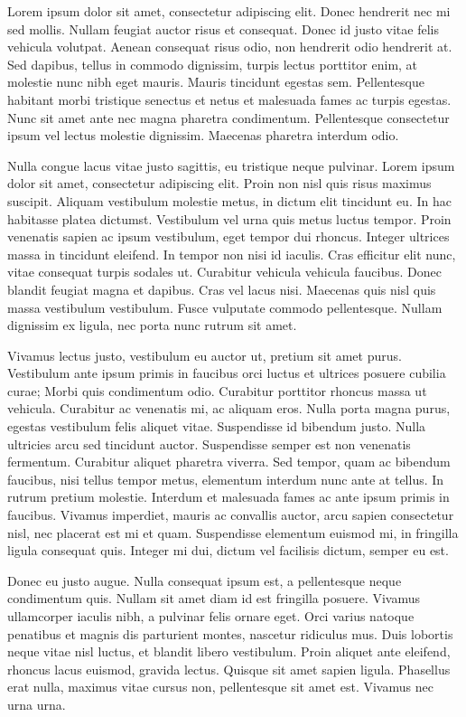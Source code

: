 \documentclass{memoir}
\begin{document}
Lorem ipsum dolor sit amet, consectetur adipiscing elit. Donec hendrerit nec mi sed mollis. Nullam feugiat auctor risus et consequat. Donec id justo vitae felis vehicula volutpat. Aenean consequat risus odio, non hendrerit odio hendrerit at. Sed dapibus, tellus in commodo dignissim, turpis lectus porttitor enim, at molestie nunc nibh eget mauris. Mauris tincidunt egestas sem. Pellentesque habitant morbi tristique senectus et netus et malesuada fames ac turpis egestas. Nunc sit amet ante nec magna pharetra condimentum. Pellentesque consectetur ipsum vel lectus molestie dignissim. Maecenas pharetra interdum odio.

Nulla congue lacus vitae justo sagittis, eu tristique neque pulvinar. Lorem ipsum dolor sit amet, consectetur adipiscing elit. Proin non nisl quis risus maximus suscipit. Aliquam vestibulum molestie metus, in dictum elit tincidunt eu. In hac habitasse platea dictumst. Vestibulum vel urna quis metus luctus tempor. Proin venenatis sapien ac ipsum vestibulum, eget tempor dui rhoncus. Integer ultrices massa in tincidunt eleifend. In tempor non nisi id iaculis. Cras efficitur elit nunc, vitae consequat turpis sodales ut. Curabitur vehicula vehicula faucibus. Donec blandit feugiat magna et dapibus. Cras vel lacus nisi. Maecenas quis nisl quis massa vestibulum vestibulum. Fusce vulputate commodo pellentesque. Nullam dignissim ex ligula, nec porta nunc rutrum sit amet.

Vivamus lectus justo, vestibulum eu auctor ut, pretium sit amet purus. Vestibulum ante ipsum primis in faucibus orci luctus et ultrices posuere cubilia curae; Morbi quis condimentum odio. Curabitur porttitor rhoncus massa ut vehicula. Curabitur ac venenatis mi, ac aliquam eros. Nulla porta magna purus, egestas vestibulum felis aliquet vitae. Suspendisse id bibendum justo. Nulla ultricies arcu sed tincidunt auctor. Suspendisse semper est non venenatis fermentum. Curabitur aliquet pharetra viverra. Sed tempor, quam ac bibendum faucibus, nisi tellus tempor metus, elementum interdum nunc ante at tellus. In rutrum pretium molestie. Interdum et malesuada fames ac ante ipsum primis in faucibus. Vivamus imperdiet, mauris ac convallis auctor, arcu sapien consectetur nisl, nec placerat est mi et quam. Suspendisse elementum euismod mi, in fringilla ligula consequat quis. Integer mi dui, dictum vel facilisis dictum, semper eu est.

Donec eu justo augue. Nulla consequat ipsum est, a pellentesque neque condimentum quis. Nullam sit amet diam id est fringilla posuere. Vivamus ullamcorper iaculis nibh, a pulvinar felis ornare eget. Orci varius natoque penatibus et magnis dis parturient montes, nascetur ridiculus mus. Duis lobortis neque vitae nisl luctus, et blandit libero vestibulum. Proin aliquet ante eleifend, rhoncus lacus euismod, gravida lectus. Quisque sit amet sapien ligula. Phasellus erat nulla, maximus vitae cursus non, pellentesque sit amet est. Vivamus nec urna urna.
\end{document}

